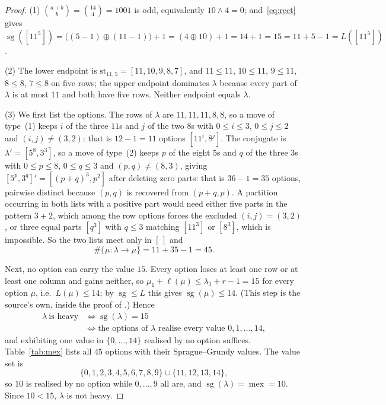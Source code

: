\documentclass[11pt]{amsart}
\theoremstyle{definition}
\theoremstyle{remark}
\newcommand{\br}[1]{[#1]}
\newcommand{\sgv}{\operatorname{sg}}
\newcommand{\mex}{\operatorname{mex}}
\newcommand{\str}{\mathrm{st}}
\begin{document}
\begin{proof}
(1) $\binom{a+b}{b}=\binom{14}{4}=1001$ is odd, equivalently
$10\wedge4=0$; and~\eqref{eq:rect} gives
$\sgv(\br{11^5})=\bigl((5-1)\oplus(11-1)\bigr)+1=(4\oplus10)+1=14+1=15
=11+5-1=L(\br{11^5})$.

(2) The lower endpoint is $\str_{11,5}=\br{11,10,9,8,7}$, and
$11\le11$, $10\le11$, $9\le11$, $8\le8$, $7\le8$ on five rows; the upper
endpoint dominates $\lambda$ because every part of $\lambda$ is at most $11$
and both have five rows. Neither endpoint equals $\lambda$.

(3) We first list the options. The rows of $\lambda$ are $11,11,11,8,8$, so a
move of type~(1) keeps $i$ of the three $11$s and $j$ of the two $8$s with
$0\le i\le3$, $0\le j\le2$ and $(i,j)\ne(3,2)$: that is $12-1=11$ options
$\br{11^i,8^j}$. The conjugate is $\lambda'=\br{5^8,3^3}$, so a move of
type~(2) keeps $p$ of the eight $5$s and $q$ of the three $3$s with
$0\le p\le8$, $0\le q\le3$ and $(p,q)\ne(8,3)$, giving
$\br{5^p,3^q}'=\br{(p+q)^3,p^2}$ after deleting zero parts: that is
$36-1=35$ options, pairwise distinct because $(p,q)$ is recovered from
$(p+q,p)$. A partition occurring in both lists with a positive part would need
either five parts in the pattern $3+2$, which among the row options forces the
excluded $(i,j)=(3,2)$, or three equal parts $\br{q^3}$ with $q\le3$ matching
$\br{11^3}$ or $\br{8^3}$, which is impossible. So the two lists meet only in
$\br{\,}$ and
\[
  \#\{\mu:\lambda\to\mu\}=11+35-1=45 .
\]

Next, no option can carry the value $15$. Every option loses at least one row
or at least one column and gains neither, so $\mu_1+\ell(\mu)\le
\lambda_1+r-1=15$ for every option $\mu$, i.e.\ $L(\mu)\le14$; by
$\sgv\le L$ this gives $\sgv(\mu)\le14$. (This step is the source's own, inside
the proof of \cite[Prop.~2.6]{GKM}.) Hence
\begin{align*}
  \lambda\ \text{is heavy}
  &\iff \sgv(\lambda)=15\\
  &\iff \text{the options of }\lambda\text{ realise every value }0,1,\dots,14,
\end{align*}
and exhibiting one value in $\{0,\dots,14\}$ realised by no option suffices.
Table~\ref{tab:mex} lists all $45$ options with their Sprague--Grundy values.
The value set is
\[
  \{0,1,2,3,4,5,6,7,8,9\}\cup\{11,12,13,14\},
\]
so $10$ is realised by no option while $0,\dots,9$ all are, and
$\sgv(\lambda)=\mex=10$. Since $10<15$, $\lambda$ is not heavy.
\end{proof}
\end{document}
